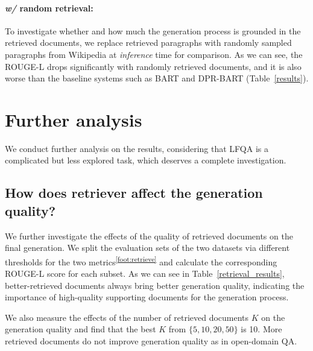 \documentclass[11pt]{article}
\begin{document}
\paragraph{\textit{w/} random retrieval:} To investigate whether and how much the generation process is grounded in the retrieved documents, we replace retrieved paragraphs with randomly sampled paragraphs from Wikipedia at \textit{inference} time for comparison. As we can see, the ROUGE-L drops significantly with randomly retrieved documents, and it is also worse than the baseline systems such as BART and DPR-BART (Table~\ref{results}).

\vspace{-5pt}
\section{Further analysis} 
\vspace{-5pt}
\label{sec:further}
We conduct further analysis on the results, considering that LFQA is a complicated but less explored task, which deserves a complete investigation. 
\vspace{-5pt}
\subsection{How does retriever affect the generation quality?}
\vspace{-3pt}
We further investigate the effects of the quality of retrieved documents on the final generation. We split the evaluation sets of the two datasets via different thresholds for the two metrics\textsuperscript{\ref{foot:retrieve}} and calculate the corresponding ROUGE-L score for each subset. As we can see in Table~\ref{retrieval_results}, better-retrieved documents always bring better generation quality, indicating the importance of high-quality supporting documents for the generation process.

We also measure the effects of the number of retrieved documents $K$ on the generation quality and find that the best $K$ from $\{5,10,20,50\}$ is 10. More retrieved documents do not improve generation quality as in open-domain QA.
\end{document}
